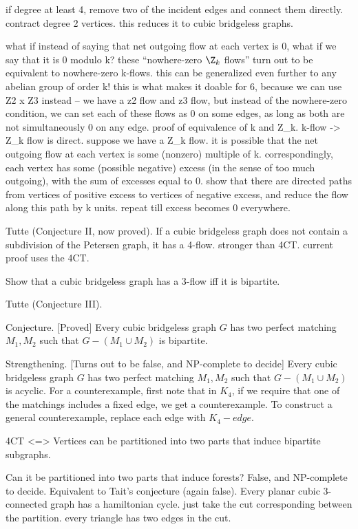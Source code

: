 if degree at least 4, remove two of the incident edges and connect them directly. contract degree 2 vertices. this reduces it to cubic bridgeless graphs.

what if instead of saying that net outgoing flow at each vertex is 0, what if we say that it is 0 modulo k? these ``nowhere-zero $\Z_k$ flows'' turn out to be equivalent to nowhere-zero k-flows.
this can be generalized even further to any abelian group of order k!
this is what makes it doable for 6, because we can use Z2 x Z3 instead -- we have a z2 flow and z3 flow, but instead of the nowhere-zero condition, we can set each of these flows as 0 on some edges, as long as both are not simultaneously 0 on any edge.
proof of equivalence of k and Z_k.
k-flow -> Z_k flow is direct. suppose we have a Z_k flow. it is possible that the net outgoing flow at each vertex is some (nonzero) multiple of k. correspondingly, each vertex has some (possible negative) excess (in the sense of too much outgoing), with the sum of excesses equal to 0. show that there are directed paths from vertices of positive excess to vertices of negative excess, and reduce the flow along this path by k units. repeat till excess becomes 0 everywhere.


Tutte (Conjecture II, now proved).
If a cubic bridgeless graph does not contain a subdivision of the Petersen graph, it has a 4-flow.
stronger than 4CT. current proof uses the 4CT.

Show that a cubic bridgeless graph has a 3-flow iff it is bipartite.

Tutte (Conjecture III).



Conjecture. [Proved]
Every cubic bridgeless graph $G$ has two perfect matching $M_1,M_2$ such that $G-(M_1 \cup M_2)$ is bipartite.

Strengthening. [Turns out to be false, and NP-complete to decide]
Every cubic bridgeless graph $G$ has two perfect matching $M_1,M_2$ such that $G-(M_1 \cup M_2)$ is acyclic.
For a counterexample, first note that in $K_4$, if we require that one of the matchings includes a fixed edge, we get a counterexample. To construct a general counterexample, replace each edge with $K_4 - edge$.


4CT <=> Vertices can be partitioned into two parts that induce bipartite subgraphs.

Can it be partitioned into two parts that induce forests? False, and NP-complete to decide.
Equivalent to Tait's conjecture (again false). Every planar cubic 3-connected graph has a hamiltonian cycle. just take the cut corresponding between the partition. every triangle has two edges in the cut.

